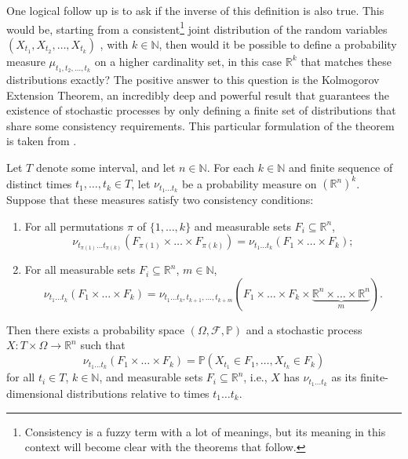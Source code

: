 One logical follow up is to ask if the inverse of this definition is also true. This would be, starting from a consistent\footnote{Consistency is a fuzzy term with a lot of meanings, but its meaning in this context will become clear with the theorems that follow.} joint distribution of the random variables $(X_{t_1}, X_{t_2}, \ldots, X_{t_k})$ , with $k \in \mathbb{N}$, then would it be possible to define a probability measure $\mu_{t_1, t_2, \ldots, t_k}$ on a higher cardinality set, in this case $\mathbb{R}^k$ that matches these distributions exactly? The positive answer to this question is the Kolmogorov Extension Theorem, an incredibly deep and powerful result that guarantees the existence of stochastic processes by only defining a finite set of distributions that share some consistency requirements. This particular formulation of the theorem is taken from \cite{enwiki:1176088789}. 

\begin{theorem}
	Let $T$ denote some interval, and let $n \in \mathbb{N}$. For each $k \in \mathbb{N}$ and finite sequence of distinct times $t_1, \ldots, t_k \in T$, let $\nu_{t_1 \ldots t_k}$ be a probability measure on $(\mathbb{R}^n)^k$. Suppose that these measures satisfy two consistency conditions:
	
	\begin{enumerate}
		\item For all permutations $\pi$ of $\{1, \ldots, k\}$ and measurable sets $F_i \subseteq \mathbb{R}^n$,
		\[
		\nu_{t_{\pi(1)}\ldots t_{\pi(k)}}\left(F_{\pi(1)} \times \ldots \times F_{\pi(k)}\right) = \nu_{t_1 \ldots t_k}\left(F_1 \times \ldots \times F_k\right);
		\]
		\item For all measurable sets $F_i \subseteq \mathbb{R}^n$, $m \in \mathbb{N}$,
		\[
		\nu_{t_1 \ldots t_k}(F_1 \times \ldots \times F_k) = \nu_{t_1 \ldots t_k, t_{k+1}, \ldots, t_{k+m}}\left(F_1 \times \ldots \times F_k \times \underbrace{\mathbb{R}^n \times \ldots \times \mathbb{R}^n}_m\right).
		\]
	\end{enumerate}
	
	Then there exists a probability space $(\Omega, \mathcal{F}, \mathbb{P})$ and a stochastic process $X: T \times \Omega \to \mathbb{R}^n$ such that
	\[
	\nu_{t_1 \ldots t_k}(F_1 \times \ldots \times F_k) = \mathbb{P}(X_{t_1} \in F_1, \ldots, X_{t_k} \in F_k)
	\]
	for all $t_i \in T$, $k \in \mathbb{N}$, and measurable sets $F_i \subseteq \mathbb{R}^n$, i.e., $X$ has $\nu_{t_1 \ldots t_k}$ as its finite-dimensional distributions relative to times $t_1 \ldots t_k$.
	
\end{theorem}

